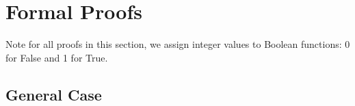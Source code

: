 \section{Formal Proofs}\label{sec:formalproof}


Note for all proofs in this section, we assign integer values to Boolean functions: 0 for False and 1 for True.


\subsection{General Case}


